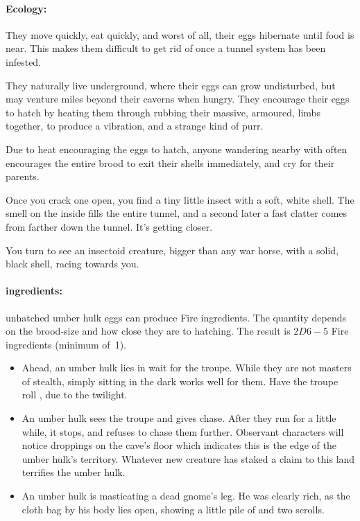 \begin{multicols}{2}
\paragraph{Ecology:}
They move quickly, eat quickly, and worst of all, their eggs hibernate until food is near.
This makes them difficult to get rid of once a tunnel system has been infested.

They naturally live underground, where their eggs can grow undisturbed, but may venture miles beyond their caverns when hungry.
They encourage their eggs to hatch by heating them through rubbing their massive, armoured, limbs together, to produce a vibration, and a strange kind of purr.

Due to heat encouraging the eggs to hatch, anyone wandering nearby with  often encourages the entire brood to exit their shells immediately, and cry for their parents.

\begin{boxtext}
  Once you crack one open, you find a tiny little insect with a soft, white shell.
  The smell on the inside fills the entire tunnel, and a second later a fast clatter comes from farther down the tunnel.
  It's getting closer.

  You turn to see an insectoid creature, bigger than any war horse, with a solid, black shell, racing towards you.
\end{boxtext}

\paragraph{\Glspl{ingredient}:}
unhatched umber hulk eggs can produce Fire \glspl{ingredient}.
The quantity depends on the brood-size and how close they are to hatching.
The result is $2D6-5$ Fire \glspl{ingredient} (minimum of~1).

\showEnc

\begin{itemize}
  \item
  Ahead, an umber hulk lies in wait for the troupe.
  While they are not masters of stealth, simply sitting in the dark works well for them.
  Have the troupe roll , \tn[9] due to the twilight.
  \item
  An umber hulk sees the troupe and gives chase.
  After they run for a little while, it stops, and refuses to chase them further.
  Observant characters will notice droppings on the cave's floor which indicates this is the edge of the umber hulk's territory.
  Whatever new creature has staked a claim to this land terrifies the umber hulk.
  \item
  An umber hulk is masticating a dead gnome's leg.
  He was clearly rich, as the cloth bag by his body lies open, showing a little pile of  and two scrolls.
\end{itemize}


\end{multicols}

